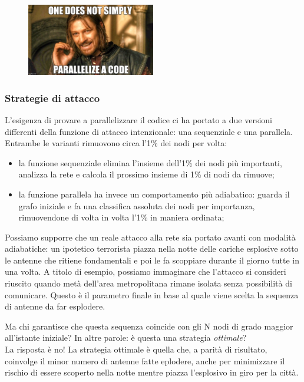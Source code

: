 \begin{figure}[h!]
	\centering
	\includegraphics[width=0.5\textwidth]{./Immagini/Attack/meme_Boromir.jpg}
\end{figure}

\subsubsection{Strategie di attacco}
L'esigenza di provare a parallelizzare il codice ci ha portato a due versioni differenti della funzione di attacco intenzionale: una sequenziale e una parallela. Entrambe le varianti rimuovono circa l'1\% dei nodi per volta: 

\begin{itemize}
 \item la funzione sequenziale elimina l'insieme dell'1\% dei nodi più importanti, analizza la rete e calcola il prossimo insieme di 1\% di nodi da rimuove;
 \item la funzione parallela ha invece un comportamento più adiabatico: guarda il grafo iniziale e fa una classifica assoluta dei nodi per importanza, rimuovendone di volta in volta l'1\% in maniera ordinata;
\end{itemize}

Possiamo supporre che un reale attacco alla rete sia portato avanti con modalità adiabatiche: un ipotetico terrorista piazza nella notte delle cariche esplosive sotto le antenne che ritiene fondamentali e poi le fa scoppiare durante il giorno tutte in una volta. A titolo di esempio, possiamo immaginare che l'attacco si consideri riuscito quando metà dell'area metropolitana rimane isolata senza possibilità di comunicare. Questo è il parametro finale in base al quale viene scelta la sequenza di antenne da far esplodere.

Ma chi garantisce che questa sequenza coincide con gli N nodi di grado maggior all'istante iniziale? In altre parole: è questa una strategia \emph{ottimale}?\\
La risposta è no! La strategia ottimale è quella che, a parità di risultato, coinvolge il minor numero di antenne fatte eplodere, anche per minimizzare il rischio di essere scoperto nella notte mentre piazza l'esplosivo in giro per la città.

